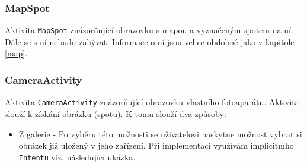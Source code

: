 \documentclass[12pt]{article}
\begin{document}
\subsubsection{MapSpot}
Aktivita \verb+MapSpot+ znázorňující obrazovku s mapou a vyznačeným spotem na ní. Dále se s ní nebudu zabývat. Informace o ní jsou velice obdobné jako v kapitole \ref{map}.
\subsubsection{CameraActivity}
Aktivita \verb+CameraActivity+ znázorňující obrazovku vlastního fotoaparátu. Aktivita slouží k získání obrázku (spotu). K tomu slouží dva způsoby:
\begin{itemize}
\item Z galerie - Po vyběru této možnosti se uživatelovi naskytne možnost vybrat si obrázek již uložený v jeho zařízení. Při implementaci využívám implicitního \verb+Intentu+ viz. následující ukázka.


\end{itemize}
\end{document}
